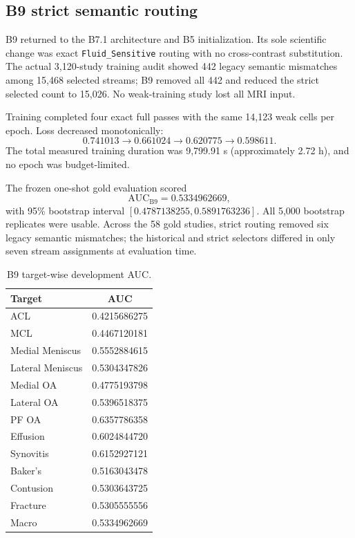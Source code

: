 \documentclass[preprint,12pt]{elsarticle}
\newcommand{\code}[1]{\texttt{#1}}
\begin{document}
\subsection{B9 strict semantic routing}
B9 returned to the B7.1 architecture and B5 initialization. Its sole scientific change was exact \code{Fluid\_Sensitive} routing with no cross-contrast substitution. The actual 3,120-study training audit showed 442 legacy semantic mismatches among 15,468 selected streams; B9 removed all 442 and reduced the strict selected count to 15,026. No weak-training study lost all MRI input.

Training completed four exact full passes with the same 14,123 weak cells per epoch. Loss decreased monotonically:
\begin{equation*}
0.741013\rightarrow0.661024\rightarrow0.620775\rightarrow0.598611.
\end{equation*}
The total measured training duration was 9,799.91 s (approximately 2.72 h), and no epoch was budget-limited.

The frozen one-shot gold evaluation scored
\begin{equation}
\mathrm{AUC}_{\mathrm{B9}}=0.5334962669,
\end{equation}
with 95\% bootstrap interval $[0.4787138255,0.5891763236]$. All 5,000 bootstrap replicates were usable. Across the 58 gold studies, strict routing removed six legacy semantic mismatches; the historical and strict selectors differed in only seven stream assignments at evaluation time.

\begin{table}[ht]
\centering
\caption{B9 target-wise development AUC.}
\label{tab:b9target}
\begin{tabular}{lc}
\toprule
Target & AUC \\
\midrule
ACL & 0.4215686275 \\
MCL & 0.4467120181 \\
Medial Meniscus & 0.5552884615 \\
Lateral Meniscus & 0.5304347826 \\
Medial OA & 0.4775193798 \\
Lateral OA & 0.5396518375 \\
PF OA & 0.6357786358 \\
Effusion & 0.6024844720 \\
Synovitis & 0.6152927121 \\
Baker's & 0.5163043478 \\
Contusion & 0.5303643725 \\
Fracture & 0.5305555556 \\
\midrule
Macro & 0.5334962669 \\
\bottomrule
\end{tabular}
\end{table}
\end{document}
